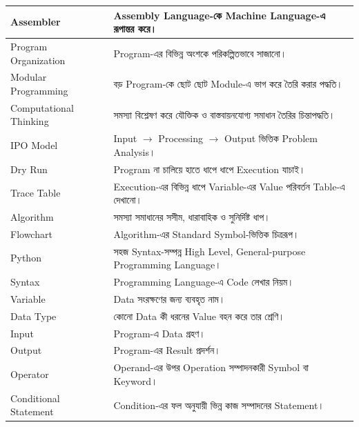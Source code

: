 \begin{longtable}{
|L{0.28\textwidth}
|L{0.64\textwidth}|
}
Assembler
&
Assembly Language-কে Machine Language-এ রূপান্তর করে।
\\
\hline

Program Organization
&
Program-এর বিভিন্ন অংশকে পরিকল্পিতভাবে সাজানো।
\\
\hline

Modular Programming
&
বড় Program-কে ছোট ছোট Module-এ ভাগ করে তৈরি করার পদ্ধতি।
\\
\hline

Computational Thinking
&
সমস্যা বিশ্লেষণ করে যৌক্তিক ও বাস্তবায়নযোগ্য সমাধান তৈরির চিন্তাপদ্ধতি।
\\
\hline

IPO Model
&
Input
\(\rightarrow\)
Processing
\(\rightarrow\)
Output ভিত্তিক Problem Analysis।
\\
\hline

Dry Run
&
Program না চালিয়ে হাতে ধাপে ধাপে Execution যাচাই।
\\
\hline

Trace Table
&
Execution-এর বিভিন্ন ধাপে Variable-এর Value পরিবর্তন Table-এ দেখানো।
\\
\hline

Algorithm
&
সমস্যা সমাধানের সসীম, ধারাবাহিক ও সুনির্দিষ্ট ধাপ।
\\
\hline

Flowchart
&
Algorithm-এর Standard Symbol-ভিত্তিক চিত্ররূপ।
\\
\hline

Python
&
সহজ Syntax-সম্পন্ন High Level, General-purpose Programming Language।
\\
\hline

Syntax
&
Programming Language-এ Code লেখার নিয়ম।
\\
\hline

Variable
&
Data সংরক্ষণের জন্য ব্যবহৃত নাম।
\\
\hline

Data Type
&
কোনো Data কী ধরনের Value বহন করে তার শ্রেণি।
\\
\hline

Input
&
Program-এ Data গ্রহণ।
\\
\hline

Output
&
Program-এর Result প্রদর্শন।
\\
\hline

Operator
&
Operand-এর উপর Operation সম্পাদনকারী Symbol বা Keyword।
\\
\hline

Conditional Statement
&
Condition-এর ফল অনুযায়ী ভিন্ন কাজ সম্পাদনের Statement।
\\
\hline


\end{longtable}
